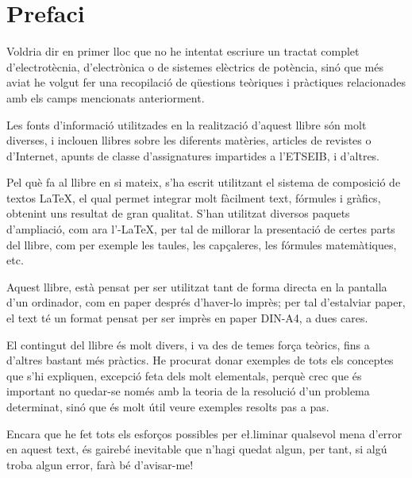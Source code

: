 \chapter*{Prefaci} 

   Voldria dir en primer lloc que no he intentat escriure un tractat complet
   d'electrot\`{e}cnia, d'electr\`{o}nica o de sistemes el\`{e}ctrics de pot\`{e}ncia, sin\'{o} que m\'{e}s aviat
   he volgut
   fer una recopilaci\'{o} de q\"{u}estions te\`{o}riques i pr\`{a}ctiques relacionades amb els camps mencionats
   anteriorment.

   Les fonts d'informaci\'{o} utilitzades en la realitzaci\'{o} d'aquest llibre s\'{o}n molt diverses,
   i inclouen llibres sobre les diferents mat\`{e}ries, articles de revistes o d'Internet,
   apunts de classe d'assignatures impartides a l'\textsf{ETSEIB}, i d'altres.

   Pel qu\`{e} fa al llibre en si mateix, s'ha escrit utilitzant el sistema de composici\'{o} de
   textos \LaTeX, el qual
   permet integrar molt f\`{a}cilment text, f\'{o}rmules i gr\`{a}fics, obtenint uns resultat de
   gran qualitat. S'han utilitzat diversos paquets d'ampliaci\'{o}, com ara
   l'\AmS-\LaTeX,
   per tal de millorar la presentaci\'{o} de certes parts del
   llibre, com per exemple les taules, les cap\c{c}aleres, les f\'{o}rmules matem\`{a}tiques, etc.

   Aquest llibre, est\`{a} pensat per ser utilitzat tant de forma directa en la pantalla d'un
   ordinador, com en paper despr\'{e}s d'haver-lo impr\`{e}s; per tal d'estalviar paper, el text
   t\'{e} un format pensat per ser impr\`{e}s en paper DIN-A4, a dues cares.

    El contingut del llibre \'{e}s molt divers, i va des de temes for\c{c}a te\`{o}rics, fins a
    d'altres bastant m\'{e}s pr\`{a}ctics. He procurat donar exemples de tots els conceptes
    que s'hi expliquen, excepci\'{o} feta dels molt elementals, perqu\`{e} crec que \'{e}s important
     no quedar-se nom\'{e}s amb la teoria de  la resoluci\'{o} d'un problema determinat, sin\'{o} que
     \'{e}s molt \'{u}til veure exemples resolts pas a pas.

    Encara que he fet tots els esfor\c{c}os possibles per e{\l.l}iminar qualsevol
    mena  d'error en aquest text, \'{e}s gaireb\'{e} inevitable que n'hagi quedat algun,
    per tant, si alg\'{u} troba algun error, far\`{a} b\'{e} d'avisar-me!


